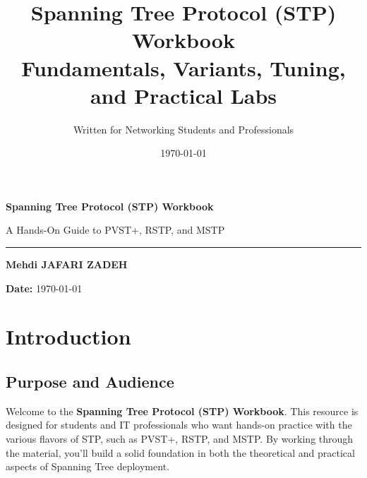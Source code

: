 \documentclass[a4paper]{report}
\title{\Huge \textbf{Spanning Tree Protocol (STP) Workbook}\\
       \Large Fundamentals, Variants, Tuning, and Practical Labs}
\author{\Large Written for Networking Students and Professionals}
\date{\today}
\begin{document}
\begin{titlepage}
    \centering
    \vspace*{4cm}
    {\Huge \textbf{Spanning Tree Protocol (STP) Workbook}\par}
    \vspace{0.8cm}
    {\Large A Hands-On Guide to PVST+, RSTP, and MSTP\par}
    \vspace{0.3cm}
    \rule{0.9\textwidth}{1pt}
    
    \vspace{0.6cm}
    {\large \textbf{Mehdi JAFARI ZADEH}}\par
    \vspace{0.3cm}

    
    \vfill
    \textbf{Date:} \today
    \vspace{2cm}
\end{titlepage}

\tableofcontents
\newpage

\chapter{Introduction}

\section{Purpose and Audience}
Welcome to the \textbf{Spanning Tree Protocol (STP) Workbook}. This resource is designed for students and IT professionals who want hands-on practice with the various flavors of STP, such as PVST+, RSTP, and MSTP. By working through the material, you’ll build a solid foundation in both the theoretical and practical aspects of Spanning Tree deployment.
\end{document}

